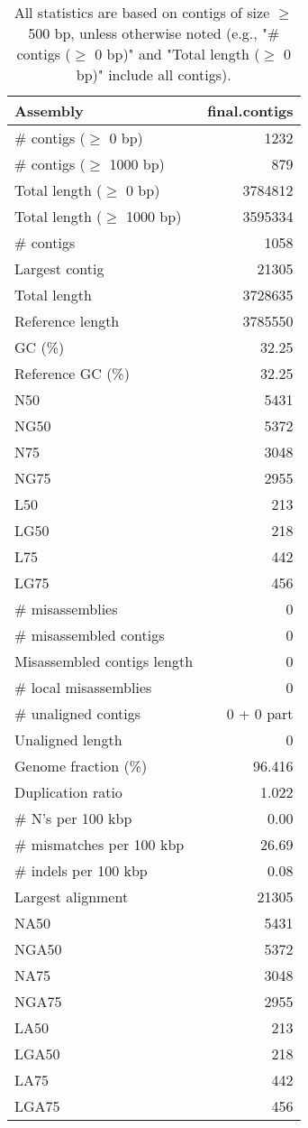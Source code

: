 \documentclass[12pt,a4paper]{article}
\begin{document}
\begin{table}[ht]
\begin{center}
\caption{All statistics are based on contigs of size $\geq$ 500 bp, unless otherwise noted (e.g., "\# contigs ($\geq$ 0 bp)" and "Total length ($\geq$ 0 bp)" include all contigs).}
\begin{tabular}{|l*{1}{|r}|}
\hline
Assembly & final.contigs \\ \hline
\# contigs ($\geq$ 0 bp) & 1232 \\ \hline
\# contigs ($\geq$ 1000 bp) & 879 \\ \hline
Total length ($\geq$ 0 bp) & 3784812 \\ \hline
Total length ($\geq$ 1000 bp) & 3595334 \\ \hline
\# contigs & 1058 \\ \hline
Largest contig & 21305 \\ \hline
Total length & 3728635 \\ \hline
Reference length & 3785550 \\ \hline
GC (\%) & 32.25 \\ \hline
Reference GC (\%) & 32.25 \\ \hline
N50 & 5431 \\ \hline
NG50 & 5372 \\ \hline
N75 & 3048 \\ \hline
NG75 & 2955 \\ \hline
L50 & 213 \\ \hline
LG50 & 218 \\ \hline
L75 & 442 \\ \hline
LG75 & 456 \\ \hline
\# misassemblies & 0 \\ \hline
\# misassembled contigs & 0 \\ \hline
Misassembled contigs length & 0 \\ \hline
\# local misassemblies & 0 \\ \hline
\# unaligned contigs & 0 + 0 part \\ \hline
Unaligned length & 0 \\ \hline
Genome fraction (\%) & 96.416 \\ \hline
Duplication ratio & 1.022 \\ \hline
\# N's per 100 kbp & 0.00 \\ \hline
\# mismatches per 100 kbp & 26.69 \\ \hline
\# indels per 100 kbp & 0.08 \\ \hline
Largest alignment & 21305 \\ \hline
NA50 & 5431 \\ \hline
NGA50 & 5372 \\ \hline
NA75 & 3048 \\ \hline
NGA75 & 2955 \\ \hline
LA50 & 213 \\ \hline
LGA50 & 218 \\ \hline
LA75 & 442 \\ \hline
LGA75 & 456 \\ \hline
\end{tabular}
\end{center}
\end{table}
\end{document}
